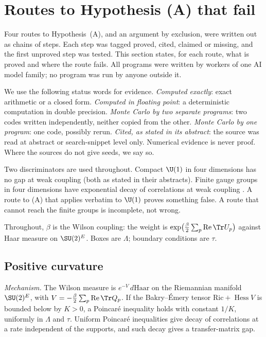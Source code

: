 
\section{Routes to Hypothesis (A) that fail}\label{sec:routes}

Four routes to Hypothesis~(A), and an argument by exclusion, were written out as chains of steps. Each step was tagged
proved, cited, claimed or missing, and the first unproved step was tested. This section
states, for each route, what is proved and where the route fails. All programs were written
by workers of one AI model family; no program was run by anyone outside it.

We use the following status words for evidence. \emph{Computed exactly}: exact arithmetic or
a closed form. \emph{Computed in floating point}: a deterministic computation in double
precision. \emph{Monte Carlo by two separate programs}: two codes written independently,
neither copied from the other. \emph{Monte Carlo by one program}: one code, possibly rerun.
\emph{Cited, as stated in its abstract}: the source was read at abstract or search-snippet
level only. Numerical evidence is never proof. Where the sources do not give seeds, we say so.

Two discriminators are used throughout. Compact $\U(1)$ in four dimensions has no gap at weak
coupling \cite{Guth80,FS82} (both as stated in their abstracts). Finite gauge groups in four
dimensions have exponential decay of correlations at weak coupling \cite{AC22}. A route to (A)
that applies verbatim to $\U(1)$ proves something false. A route that cannot reach the finite
groups is incomplete, not wrong.

Throughout, $\beta$ is the Wilson coupling: the weight is
$\exp\bigl(\tfrac{\beta}{2}\sum_p \operatorname{Re}\Tr U_p\bigr)$ against Haar measure on
$\SU(2)^E$. Boxes are $\Lambda$; boundary conditions are $\tau$.

\subsection{Positive curvature}\label{neg:sub-curv}

\emph{Mechanism.} The Wilson measure is $e^{-V}\,d\mathrm{Haar}$ on the Riemannian manifold
$\SU(2)^E$, with $V=-\frac{\beta}{2}\sum_p\operatorname{Re}\Tr Q_p$. If the Bakry--\'Emery tensor
$\mathrm{Ric}+\operatorname{Hess}V$ is bounded below by $K>0$, a Poincar\'e inequality holds with
constant $1/K$, uniformly in $\Lambda$ and $\tau$. Uniform Poincar\'e inequalities give decay of
correlations at a rate independent of the supports, and such decay gives a transfer-matrix gap.

